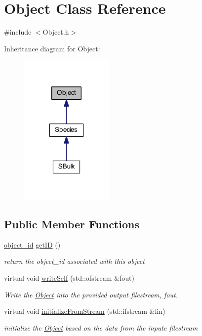 \hypertarget{classObject}{\section{Object Class Reference}
\label{classObject}
}


{\ttfamily \#include $<$Object.\-h$>$}



Inheritance diagram for Object\-:
\nopagebreak
\begin{figure}[H]
\begin{center}
\leavevmode
\includegraphics[width=130pt]{classObject__inherit__graph}
\end{center}
\end{figure}
\subsection*{Public Member Functions}
\begin{DoxyCompactItemize}
\item 
\hyperlink{Object_8h_a0b56ddf6ace42572542aae1f2c364e05}{object\-\_\-id} \hyperlink{classObject_a4dd34b912b01d62f8e5aa9bcb4e82e81}{get\-I\-D} ()
\begin{DoxyCompactList}\small\item\em return the object\-\_\-id associated with this object \end{DoxyCompactList}\item 
virtual void \hyperlink{classObject_a3f41123d1b33b22e5eb71fd2794577d9}{write\-Self} (std\-::ofstream \&fout)
\begin{DoxyCompactList}\small\item\em Write the \hyperlink{classObject}{Object} into the provided output filestream, fout. \end{DoxyCompactList}\item 
virtual void \hyperlink{classObject_a7695d57d88356ed2649255a48e4ffdbe}{initialize\-From\-Stream} (std\-::ifstream \&fin)
\begin{DoxyCompactList}\small\item\em initialize the \hyperlink{classObject}{Object} based on the data from the inpute filestream \end{DoxyCompactList}\end{DoxyCompactItemize}
